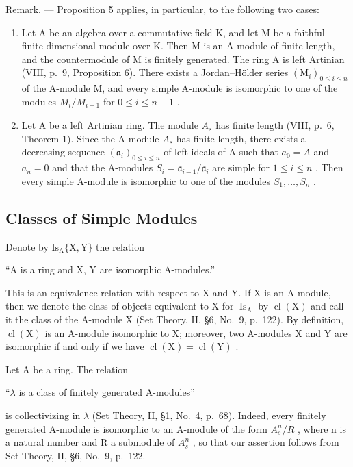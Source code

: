 Remark. --- Proposition 5 applies, in particular, to the following two cases:

\begin{enumerate}
\def\labelenumi{\alph{enumi})}
\item
  Let A be an algebra over a commutative field K, and let M be a faithful finite-dimensional module over K. Then M is an A-module of finite length, and the countermodule of M is finitely generated. The ring A is left Artinian (VIII, p.~9, Proposition 6). There exists a Jordan--Hölder series \((\mathrm{M}_{i})_{0\leqslant i\leqslant n}\) of the A-module M, and every simple A-module is isomorphic to one of the modules \(M_{i}/M_{i+1}\) for \(0\leqslant i\leqslant n-1\) .
\item
  Let A be a left Artinian ring. The module \(A_{s}\) has finite length (VIII, p.~6, Theorem 1). Since the A-module \(A_{s}\) has finite length, there exists a decreasing sequence \((\mathfrak{a}_{i})_{0\leqslant i\leqslant n}\) of left ideals of A such that \(a_{0}=A\) and \(a_{n}=0\) and that the A-modules \(S_{i}=\mathfrak{a}_{i-1}/\mathfrak{a}_{i}\) are simple for \(1\leqslant i\leqslant n\) . Then every simple A-module is isomorphic to one of the modules \(S_{1},\ldots,S_{n}\) .
\end{enumerate}

\subsection{Classes of Simple Modules}

Denote by \(\mathrm{Is}_{\mathrm{A}}\{\mathrm{X},\mathrm{Y}\}\) the relation

``A is a ring and X, Y are isomorphic A-modules.''

This is an equivalence relation with respect to X and Y. If X is an A-module, then we denote the class of objects equivalent to X for \(\operatorname{Is}_{\mathrm{A}}\) by \(\operatorname{cl}(\mathrm{X})\) and call it the class of the A-module X (Set Theory, II, §6, No.~9, p.~122). By definition, \(\operatorname{cl}(\mathrm{X})\) is an A-module isomorphic to X; moreover, two A-modules X and Y are isomorphic if and only if we have \(\operatorname{cl}(\mathrm{X}) = \operatorname{cl}(\mathrm{Y})\) .

Let A be a ring. The relation

``\(\lambda\) is a class of finitely generated A-modules''

is collectivizing in \(\lambda\) (Set Theory, II, §1, No.~4, p.~68). Indeed, every finitely generated A-module is isomorphic to an A-module of the form \(A_{s}^{n}/R\) , where n is a natural number and R a submodule of \(A_{s}^{n}\) , so that our assertion follows from Set Theory, II, §6, No.~9, p.~122.

